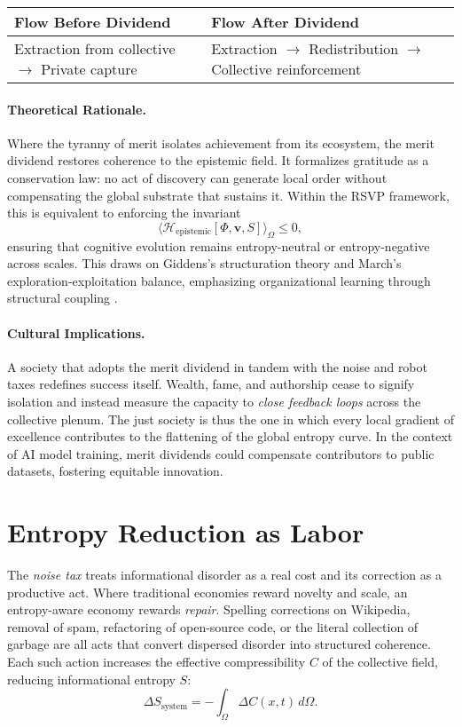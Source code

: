 \documentclass[12pt]{article}
\begin{document}
\begin{center}
\begin{tabular}{@{}ll@{}}
\toprule
\textbf{Flow Before Dividend} & \textbf{Flow After Dividend} \\
\midrule
Extraction from collective $\to$ Private capture & Extraction $\to$ Redistribution $\to$ Collective reinforcement \\
\bottomrule
\end{tabular}
\end{center}

\paragraph{Theoretical Rationale.}
Where the tyranny of merit isolates achievement from its ecosystem, the merit dividend restores coherence to the epistemic field. It formalizes gratitude as a conservation law: no act of discovery can generate local order without compensating the global substrate that sustains it. Within the RSVP framework, this is equivalent to enforcing the invariant
\[
\langle \mathcal{H}_\text{epistemic}[\Phi,\mathbf{v},S] \rangle_{\Omega} \le 0,
\]
ensuring that cognitive evolution remains entropy-neutral or entropy-negative across scales. This draws on Giddens's structuration theory and March's exploration-exploitation balance, emphasizing organizational learning through structural coupling \citep{giddens1984constitution, march1991exploration}.

\paragraph{Cultural Implications.}
A society that adopts the merit dividend in tandem with the noise and robot taxes redefines success itself. Wealth, fame, and authorship cease to signify isolation and instead measure the capacity to \emph{close feedback loops} across the collective plenum. The just society is thus the one in which every local gradient of excellence contributes to the flattening of the global entropy curve. In the context of AI model training, merit dividends could compensate contributors to public datasets, fostering equitable innovation.

\section{Entropy Reduction as Labor}
\label{sec:entropy-reduction}
The \emph{noise tax} treats informational disorder as a real cost and its correction as a productive act. Where traditional economies reward novelty and scale, an entropy-aware economy rewards \emph{repair}. Spelling corrections on Wikipedia, removal of spam, refactoring of open-source code, or the literal collection of garbage are all acts that convert dispersed disorder into structured coherence. Each such action increases the effective compressibility $C$ of the collective field, reducing informational entropy $S$:
\[
\Delta S_{\text{system}} = -\!\int_{\Omega} \Delta C(x,t)\,d\Omega.
\]
\end{document}
